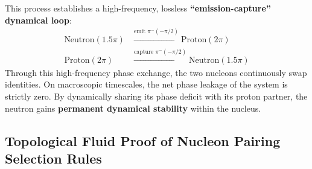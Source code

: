 \documentclass[12pt, a4paper]{article}
\begin{document}
This process establishes a high-frequency, lossless \textbf{``emission-capture'' dynamical loop}:
\begin{equation}
\begin{aligned}
\text{Neutron}(1.5\pi) &\xrightarrow{\text{emit } \pi^-(-\pi/2)} \text{Proton}(2\pi) \\
\text{Proton}(2\pi) &\xrightarrow{\text{capture } \pi^-(-\pi/2)} \text{Neutron}(1.5\pi)
\end{aligned} \label{eq:exchange_loop}
\end{equation}
Through this high-frequency phase exchange, the two nucleons continuously swap identities. On macroscopic timescales, the net phase leakage of the system is strictly zero. By dynamically sharing its phase deficit with its proton partner, the neutron gains \textbf{permanent dynamical stability} within the nucleus.

\subsection{Topological Fluid Proof of Nucleon Pairing Selection Rules}
\end{document}
